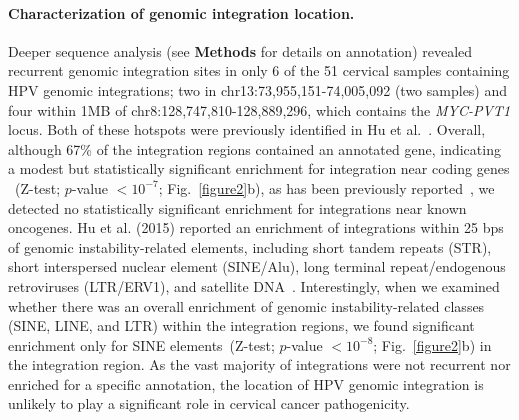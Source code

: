\documentclass{bmcart}
\begin{document}
\paragraph{\textbf{Characterization of genomic integration location.}} Deeper sequence analysis (see \textbf{Methods} for details on
annotation) revealed recurrent genomic integration sites in only 6 of
the 51 cervical samples containing HPV genomic integrations; two in
chr13:73,955,151-74,005,092 (two samples) and four within 1MB of
chr8:128,747,810-128,889,296, which contains the \emph{MYC-PVT1} locus. Both
of these hotspots were previously identified
in Hu et al.~\cite{Hu2015}. Overall, although 67\% of the integration regions
contained an annotated gene, indicating a modest but statistically
significant enrichment for integration near coding genes ~(Z-test;
$p$-value $<10^{-7}$; Fig.~\ref{figure2}b), as has been previously
reported~\cite{Akagi2014}, we detected no statistically significant
enrichment for integrations near known oncogenes.  Hu et al. (2015)
reported an enrichment of integrations within 25 bps of genomic
instability-related elements, including short tandem repeats (STR),
short interspersed nuclear element (SINE/Alu), long terminal
repeat/endogenous retroviruses (LTR/ERV1), and satellite
DNA~\cite{Hu2015}.  Interestingly, when we examined whether there was
an overall enrichment of genomic instability-related classes (SINE,
LINE, and LTR) within the integration regions, we found significant
enrichment only for SINE elements~(Z-test; $p$-value $<10^{-8}$;
Fig.~\ref{figure2}b) in the integration region. As the vast majority
of integrations were not recurrent nor enriched for a specific
annotation, the location of HPV genomic integration is unlikely to
play a significant role in cervical cancer pathogenicity.
\end{document}
